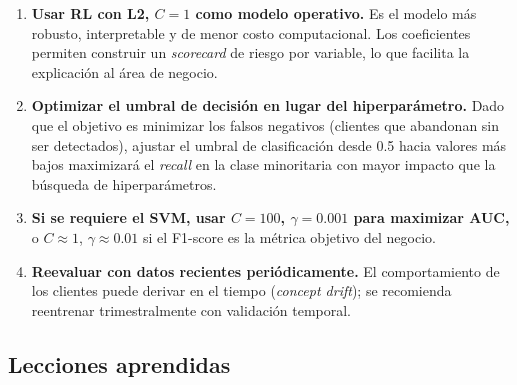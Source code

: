 \documentclass[spanish]{article}
\begin{document}
\begin{enumerate}
    \item \textbf{Usar RL con L2, $C=1$ como modelo operativo.} Es el modelo más robusto, interpretable y de menor costo computacional. Los coeficientes permiten construir un \textit{scorecard} de riesgo por variable, lo que facilita la explicación al área de negocio.

    \item \textbf{Optimizar el umbral de decisión en lugar del hiperparámetro.} Dado que el objetivo es minimizar los falsos negativos (clientes que abandonan sin ser detectados), ajustar el umbral de clasificación desde 0.5 hacia valores más bajos maximizará el \textit{recall} en la clase minoritaria con mayor impacto que la búsqueda de hiperparámetros.

    \item \textbf{Si se requiere el SVM, usar $C=100$, $\gamma=0.001$ para maximizar AUC,} o $C \approx 1$, $\gamma \approx 0.01$ si el F1-score es la métrica objetivo del negocio.

    \item \textbf{Reevaluar con datos recientes periódicamente.} El comportamiento de los clientes puede derivar en el tiempo (\textit{concept drift}); se recomienda reentrenar trimestralmente con validación temporal.
\end{enumerate}

\subsection{Lecciones aprendidas}
\end{document}
